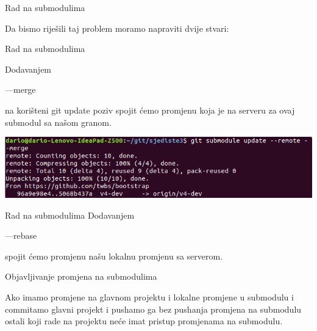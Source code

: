 \documentclass[10pt]{beamer}
\begin{document}
\begin{frame}[fragile]{Rad na submodulima}
    
    Da bismo riješili taj problem moramo napraviti dvije stvari:
\end{frame}

\begin{frame}[fragile]{Rad na submodulima}
    
    Dodavanjem \begin{semiverbatim}---merge\end{semiverbatim} na korišteni git update poziv spojit ćemo promjenu koja je na serveru za ovaj submodul sa našom granom.

    \includegraphics[scale=0.4]{sub_merge}
\end{frame}

\begin{frame}[fragile]{Rad na submodulima}
    Dodavanjem
    \begin{semiverbatim}---rebase\end{semiverbatim}
    spojit ćemo promjenu našu lokalnu promjenu sa serverom.
\end{frame}

\begin{frame}[fragile]{Objavljivanje promjena na submodulima}
    
    Ako imamo promjene na glavnom projektu i lokalne promjene u submodulu i commitamo glavni projekt i pushamo ga bez pushanja promjena na submodulu ostali koji rade na projektu neće imat pristup promjenama na submodulu. 
    
\end{frame}
\end{document}
